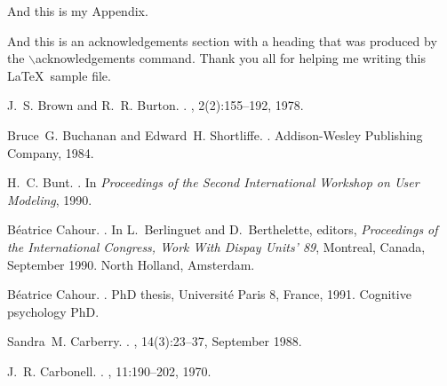 \documentclass{kluwer}    %
\begin{document}
\begin{article}
\appendix

And this is my Appendix.


\acknowledgements
And this is an acknowledgements section with a heading that was produced by the
$\backslash$acknowledgements command. Thank you all for helping me writing this
\LaTeX\ sample file.


\theendnotes

\begin{thebibliography}{}

J.~S. Brown and R.~R. Burton.
.
, 2(2):155--192, 1978.

Bruce~G. Buchanan and Edward~H. Shortliffe.
.
\newblock Addison-Wesley Publishing Company, 1984.

H.~C. Bunt.
.
\newblock In {\em Proceedings of the Second International Workshop on User
  Modeling}, 1990.

B\'eatrice Cahour.
.
\newblock In L.~Berlinguet and D.~Berthelette, editors, {\em Proceedings of the
  International Congress, Work With Dispay Units' 89}, Montreal, Canada,
  September 1990. North Holland, Amsterdam.

B\'eatrice Cahour.
.
\newblock PhD thesis, Universit\'e Paris 8, France, 1991.
\newblock Cognitive psychology PhD.

Sandra~M. Carberry.
.
, 14(3):23--37, September 1988.

J.~R. Carbonell.
.
, 11:190--202, 1970.


\end{thebibliography}
\end{article}
\end{document}

